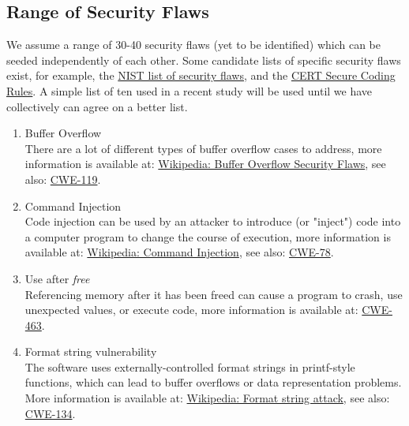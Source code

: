 \subsection{Range of Security Flaws}
         We assume a range of 30-40 security flaws (yet to be identified)
         which can be seeded independently of each other.  Some candidate lists of
         specific security flaws exist,
         for example, the \href{http://nvd.nist.gov/cwe.cfm}{NIST list of security flaws}, 
         and the 
         \href{https://www.securecoding.cert.org/confluence/display/seccode/CERT+Secure+Coding+Standards}{CERT Secure Coding Rules}.
         A simple list of ten used in a recent study will be used until we have
         collectively can agree on a better list.
      \begin{enumerate}
         \item Buffer Overflow \\
               There are a lot of different types of buffer overflow cases to address,
               more information is available at:
               \href{http://en.wikipedia.org/wiki/Buffer_overflow}{Wikipedia: Buffer Overflow Security Flaws},
               see also:
               \href{http://cwe.mitre.org/data/definitions/119.html}{CWE-119}.

         \item Command Injection \\
               Code injection can be used by an attacker to introduce (or "inject") code
               into a computer program to change the course of execution, more information
               is available at:
               \href{http://en.wikipedia.org/wiki/Command_injection}{Wikipedia: Command Injection},
               see also:
               \href{http://cwe.mitre.org/data/definitions/78.html}{CWE-78}.

         \item Use after {\em free} \\
               Referencing memory after it has been freed can cause a program to crash,
               use unexpected values, or execute code, more information is available at:
               \href{http://cwe.mitre.org/data/definitions/463.html}{CWE-463}.

         \item Format string vulnerability \\
               The software uses externally-controlled format strings in printf-style
               functions, which can lead to buffer overflows or data representation
               problems. More information is available at:
               \href{http://en.wikipedia.org/wiki/Format_string_vulnerabilities}{Wikipedia: Format string attack}, 
               see also:
               \href{http://cwe.mitre.org/data/definitions/134.html}{CWE-134}.


\end{enumerate}
